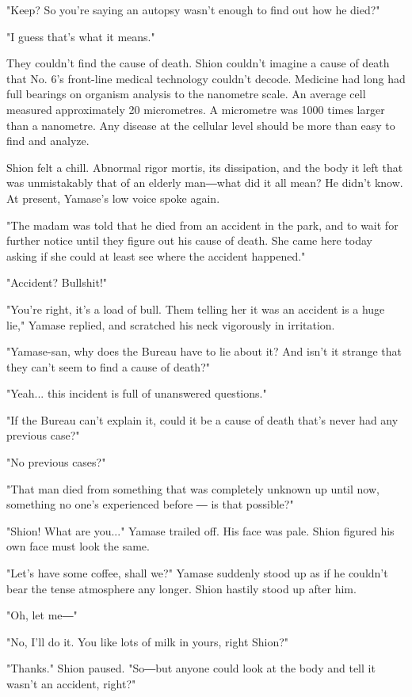"Keep? So you're saying an autopsy wasn't enough to find out how he
died?"

"I guess that's what it means."

They couldn't find the cause of death. Shion couldn't imagine a cause of
death that No. 6's front-line medical technology couldn't decode.
Medicine had long had full bearings on organism analysis to the
nanometre scale. An average cell measured approximately 20 micrometres.
A micrometre was 1000 times larger than a nanometre. Any disease at the
cellular level should be more than easy to find and analyze.

Shion felt a chill. Abnormal rigor mortis, its dissipation, and the body
it left that was unmistakably that of an elderly man―what did it all
mean? He didn't know. At present, Yamase's low voice spoke again.

"The madam was told that he died from an accident in the park, and to
wait for further notice until they figure out his cause of death. She
came here today asking if she could at least see where the accident
happened."

"Accident? Bullshit!"

"You're right, it's a load of bull. Them telling her it was an accident
is a huge lie," Yamase replied, and scratched his neck vigorously in
irritation.

"Yamase-san, why does the Bureau have to lie about it? And isn't it
strange that they can't seem to find a cause of death?"

"Yeah... this incident is full of unanswered questions."

"If the Bureau can't explain it, could it be a cause of death that's
never had any previous case?"

"No previous cases?"

"That man died from something that was completely unknown up until now,
something no one's experienced before ― is that possible?"

"Shion! What are you..." Yamase trailed off. His face was pale. Shion
figured his own face must look the same.

"Let's have some coffee, shall we?" Yamase suddenly stood up as if he
couldn't bear the tense atmosphere any longer. Shion hastily stood up
after him.

"Oh, let me―"

"No, I'll do it. You like lots of milk in yours, right Shion?"

"Thanks." Shion paused. "So―but anyone could look at the body and tell
it wasn't an accident, right?"

